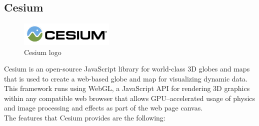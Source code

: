 \subsection{Cesium}
\begin{figure} [h]
\centering
\includegraphics[width=0.4\textwidth]{chapter2/images/cesium_logo}
\caption{Cesium logo}
\label{fig:cesium_logo}
\end{figure}
Cesium is an open-source JavaScript library for world-class 3D globes and maps that is used to create a web-based globe and map for visualizing dynamic data. This framework runs using WebGL, a JavaScript API for rendering 3D graphics within any compatible web browser that allows GPU--accelerated usage of physics and image processing and effects as part of the web page canvas.\\ 
The features that Cesium provides are the following:
